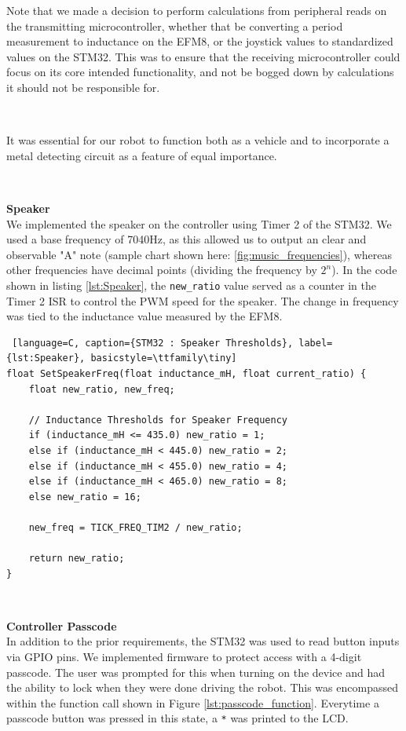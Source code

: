 \documentclass{article}
\begin{document}
Note that we made a decision to perform calculations from peripheral reads on the transmitting microcontroller, whether that be converting a period measurement to inductance on the EFM8,
or the joystick values to standardized values on the STM32. This was to ensure that the receiving microcontroller could focus on its core intended functionality, and not be bogged down by
calculations it should not be responsible for.

\

It was essential for our robot to function both as a vehicle and to incorporate a metal detecting circuit as a feature of equal importance.

\

\textbf{Speaker} \\
We implemented the speaker on the controller using Timer 2 of the STM32. We used a base frequency of 7040Hz, as this allowed us to output an clear and observable
"A" note (sample chart shown here: \ref{fig:music_frequencies}), whereas other frequencies have decimal points (dividing the frequency by $2^n$).
In the code shown in listing \ref{lst:Speaker}, the \texttt{new\_ratio} value served as a counter in the Timer 2 ISR to control the PWM speed for the speaker.
The change in frequency was tied to the inductance value measured by the EFM8.

\begin{lstlisting} [language=C, caption={STM32 : Speaker Thresholds}, label={lst:Speaker}, basicstyle=\ttfamily\tiny]
float SetSpeakerFreq(float inductance_mH, float current_ratio) {
    float new_ratio, new_freq;

    // Inductance Thresholds for Speaker Frequency
    if (inductance_mH <= 435.0) new_ratio = 1;
    else if (inductance_mH < 445.0) new_ratio = 2;
    else if (inductance_mH < 455.0) new_ratio = 4;
    else if (inductance_mH < 465.0) new_ratio = 8;
    else new_ratio = 16;

    new_freq = TICK_FREQ_TIM2 / new_ratio;

    return new_ratio;
}
\end{lstlisting}

\

\textbf{Controller Passcode} \\
In addition to the prior requirements, the STM32 was used to read button inputs via GPIO pins. We implemented firmware to protect access with a 4-digit passcode. The user was prompted for this when turning on the device and had the ability to lock when they were done driving the robot. This was encompassed within the function call shown in Figure \ref{lst:passcode_function}. Everytime a passcode button was pressed in this state, a \texttt{*} was printed to the LCD.
\end{document}
